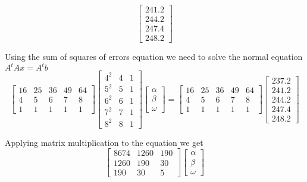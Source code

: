 \documentclass{article}
\begin{document}
\begin{enumerate}
\[\begin{bmatrix}
        241.2 \\
        244.2 \\
        247.4 \\
        248.2 
      \end{bmatrix}
    \]
    \par
    Using the sum of squares of errors equation we need to solve the normal equation $A^tAx=A^tb$
    \[
      \begin{bmatrix}
        16 & 25 & 36 & 49 & 64 \\
        4 & 5 & 6 & 7 & 8 \\
        1 & 1 & 1 & 1 & 1
      \end{bmatrix}
      \begin{bmatrix}
        4^2 & 4 & 1 \\
        5^2 & 5 & 1 \\
        6^2 & 6 & 1 \\
        7^2 & 7 & 1 \\
        8^2 & 8 & 1 
      \end{bmatrix}
      \begin{bmatrix}
        \alpha \\
        \beta \\
        \omega
      \end{bmatrix}
      = 
      \begin{bmatrix}
        16 & 25 & 36 & 49 & 64 \\
        4 & 5 & 6 & 7 & 8 \\
        1 & 1 & 1 & 1 & 1
      \end{bmatrix}
      \begin{bmatrix}
        237.2 \\
        241.2 \\
        244.2 \\
        247.4 \\
        248.2 
      \end{bmatrix}
    \]
    \par
    Applying matrix multiplication to the equation we get
    \[
      \begin{bmatrix}
        8674 & 1260 & 190 \\
        1260 & 190 & 30 \\
        190 & 30 & 5
      \end{bmatrix}
      \begin{bmatrix}
        \alpha \\
        \beta \\
        \omega

\end{bmatrix}\]
\end{enumerate}
\end{document}
